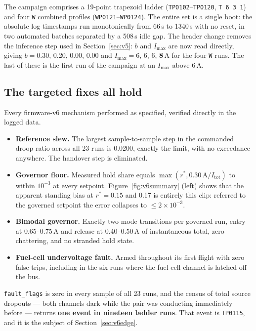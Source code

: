 \documentclass[11pt]{article}
\newcommand{\code}[1]{\texttt{#1}}
\begin{document}
The campaign comprises a 19-point trapezoid ladder
(\code{TP0102}--\code{TP0120}, \code{T 6 3 1}) and four \code{W} combined
profiles (\code{WP0121}--\code{WP0124}). The entire set is a single boot: the
absolute log timestamps run monotonically from 66\,s to 1340\,s with no reset,
in two automated batches separated by a 508\,s idle gap. The header change
removes the inference step used in Section~\ref{sec:v5}: $b$ and
$I_\mathrm{max}$ are now read directly, giving $b=0.30$, 0.20, 0.00, 0.00 and
$I_\mathrm{max}=6$, 6, 6, \textbf{8}\,A for the four \code{W} runs. The last of
these is the first run of the campaign at an $I_\mathrm{max}$ above 6\,A.

\subsection{The targeted fixes all hold}

Every firmware-v6 mechanism performed as specified, verified directly in the
logged data.

\begin{itemize}
\item \textbf{Reference slew.} The largest sample-to-sample step in the commanded
droop ratio across all 23 runs is 0.0200, exactly the limit, with no exceedance
anywhere. The handover step is eliminated.
\item \textbf{Governor floor.} Measured hold share equals
$\max(r^\ast, 0.30\,\mathrm{A}/I_\mathrm{tot})$ to within $10^{-3}$ at every
setpoint. Figure~\ref{fig:v6summary} (left) shows that the apparent standing bias
at $r^\ast=0.15$ and 0.17 is entirely this clip: referred to the governed
setpoint the error collapses to $\le2\times10^{-3}$.
\item \textbf{Bimodal governor.} Exactly two mode transitions per governed run,
entry at 0.65--0.75\,A and release at 0.40--0.50\,A of instantaneous total, zero
chattering, and no stranded hold state.
\item \textbf{Fuel-cell undervoltage fault.} Armed throughout its first flight
with zero false trips, including in the six runs where the fuel-cell channel is
latched off the bus.
\end{itemize}

\code{fault\_flags} is zero in every sample of all 23 runs, and the census of
total source dropouts --- both channels dark while the pair was conducting
immediately before --- returns \textbf{one event in nineteen ladder runs}. That
event is \code{TP0115}, and it is the subject of Section~\ref{sec:v6edge}.
\end{document}
